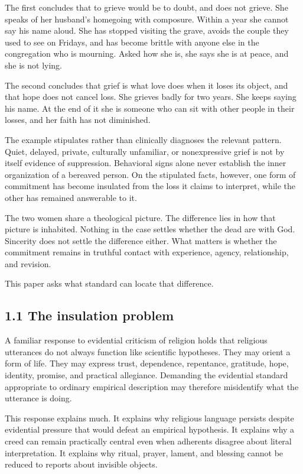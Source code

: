 \documentclass[
  11pt,
]{article}
\begin{document}
The first concludes that to grieve would be to doubt, and does not
grieve. She speaks of her husband's homegoing with composure. Within a
year she cannot say his name aloud. She has stopped visiting the grave,
avoids the couple they used to see on Fridays, and has become brittle
with anyone else in the congregation who is mourning. Asked how she is,
she says she is at peace, and she is not lying.

The second concludes that grief is what love does when it loses its
object, and that hope does not cancel loss. She grieves badly for two
years. She keeps saying his name. At the end of it she is someone who
can sit with other people in their losses, and her faith has not
diminished.

The example stipulates rather than clinically diagnoses the relevant
pattern. Quiet, delayed, private, culturally unfamiliar, or
nonexpressive grief is not by itself evidence of suppression. Behavioral
signs alone never establish the inner organization of a bereaved person.
On the stipulated facts, however, one form of commitment has become
insulated from the loss it claims to interpret, while the other has
remained answerable to it.

The two women share a theological picture. The difference lies in how
that picture is inhabited. Nothing in the case settles whether the dead
are with God. Sincerity does not settle the difference either. What
matters is whether the commitment remains in truthful contact with
experience, agency, relationship, and revision.

This paper asks what standard can locate that difference.

\subsection{1.1 The insulation problem}\label{the-insulation-problem}

A familiar response to evidential criticism of religion holds that
religious utterances do not always function like scientific hypotheses.
They may orient a form of life. They may express trust, dependence,
repentance, gratitude, hope, identity, promise, and practical
allegiance. Demanding the evidential standard appropriate to ordinary
empirical description may therefore misidentify what the utterance is
doing.

This response explains much. It explains why religious language persists
despite evidential pressure that would defeat an empirical hypothesis.
It explains why a creed can remain practically central even when
adherents disagree about literal interpretation. It explains why ritual,
prayer, lament, and blessing cannot be reduced to reports about
invisible objects.
\end{document}
